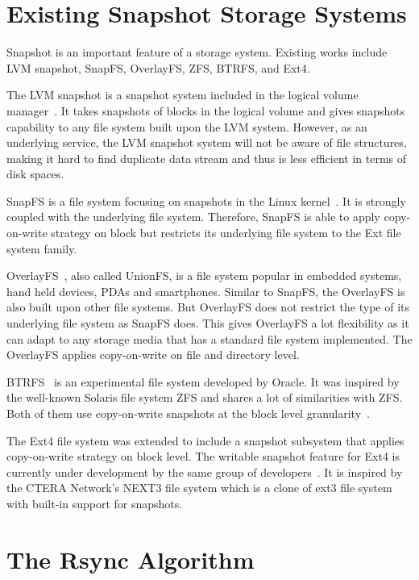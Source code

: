 \section{Existing Snapshot Storage Systems}

    Snapshot is an important feature of a storage system. Existing works include LVM snapshot, SnapFS, OverlayFS, ZFS, BTRFS, and Ext4.
    
    The LVM snapshot is a snapshot system included in the logical volume manager~\cite{lvm, disk_perform_lvm}. It takes snapshots of blocks in the logical volume and gives snapshots capability to any file system built upon the LVM system. However, as an underlying service, the LVM snapshot system will not be aware of file structures, making it hard to find duplicate data stream and thus is less efficient in terms of disk spaces.
    
    SnapFS is a file system focusing on snapshots in the Linux kernel~\cite{snapfs}. It is strongly coupled with the underlying file system. Therefore, SnapFS is able to apply copy-on-write strategy on block but restricts its underlying file system to the Ext file system family. 
    
    OverlayFS~\cite{overlayfs}, also called UnionFS, is a file system popular in embedded systems, hand held devices, PDAs and smartphones. Similar to SnapFS, the OverlayFS is also built upon other file systems. But OverlayFS does not restrict the type of its underlying file system as SnapFS does. This gives OverlayFS a lot flexibility as it can adapt to any storage media that has a standard file system implemented. The OverlayFS applies copy-on-write on file and directory level.

    BTRFS~\cite{btrfs} is an experimental file system developed by Oracle. It was inspired by the well-known Solaris file system ZFS and shares a lot of similarities with ZFS. Both of them use copy-on-write snapshots at the block level granularity~\cite{btrfscow}.
    
    The Ext4 file system was extended to include a snapshot subsystem that applies copy-on-write strategy on block level. The writable snapshot feature for Ext4 is currently under development by the same group of developers~\cite{ext4snap}. It is inspired by the CTERA Network's NEXT3 file system which is a clone of ext3 file system with built-in support for snapshots.

\section{The Rsync Algorithm}
    

